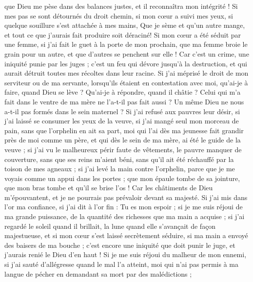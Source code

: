 \begin{multicols}{2}
que Dieu me pèse dans des balances justes, et il reconnaîtra mon intégrité !
Si mes pas se sont détournés du droit chemin, si mon cœur a suivi mes yeux, si quelque souillure s'est attachée à mes mains,
Que je sème et qu'un autre mange, et tout ce que j'aurais fait produire soit déraciné!
Si mon cœur a été séduit par une femme, si j'ai fait le guet à la porte de mon prochain,
que ma femme broie le grain pour un autre, et que d'autres se penchent sur elle !
Car c'est un crime, une iniquité punie par les juges ;
c'est un feu qui dévore jusqu'à la destruction, et qui aurait détruit toutes mes récoltes dans leur racine.
Si j'ai méprisé le droit de mon serviteur ou de ma servante, lorsqu'ils étaient en contestation avec moi,
qu'ai-je à faire, quand Dieu se lève ? Qu'ai-je à répondre, quand il châtie ?
Celui qui m'a fait dans le ventre de ma mère ne l'a-t-il pas fait aussi ? Un même Dieu ne nous a-t-il pas formés dans le sein maternel ?
Si j'ai refusé aux pauvres leur désir, si j'ai laissé se consumer les yeux de la veuve,
si j'ai mangé seul mon morceau de pain, sans que l'orphelin en ait sa part,
moi qui l'ai dès ma jeunesse fait grandir près de moi comme un père, et qui dès le sein de ma mère, ai été le guide de la veuve ;
si j'ai vu le malheureux périr faute de vêtements, le pauvre manquer de couverture,
sans que ses reins m'aient béni, sans qu'il ait été réchauffé par la toison de mes agneaux ;
si j'ai levé la main contre l'orphelin, parce que je me voyais comme un appui dans les portes ;
que mon épaule tombe de sa jointure, que mon bras tombe et qu'il se brise l'os !
Car les châtiments de Dieu m'épouvantent, et je ne pourrais pas prévaloir devant sa majesté.
Si j'ai mis dans l'or ma confiance, si j'ai dit à l'or fin : Tu es mon espoir ;
si je me suis réjoui de ma grande puissance, de la quantité des richesses que ma main a acquise ;
si j'ai regardé le soleil quand il brillait, la lune quand elle s'avançait de façon majestueuse,
et si mon cœur s'est laissé secrètement séduire, si ma main a envoyé des baisers de ma bouche ;
c'est encore une iniquité que doit punir le juge, et j'aurais renié le Dieu d'en haut !
Si je me suis réjoui du malheur de mon ennemi, si j'ai sauté d'allégresse quand le mal l'a atteint,
moi qui n'ai pas permis à ma langue de pécher en demandant sa mort par des malédictions ;

\end{multicols}
